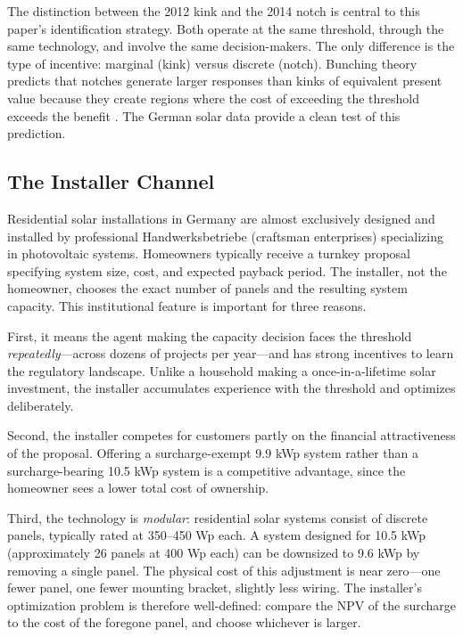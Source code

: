 \documentclass[12pt]{article}
\begin{document}
The distinction between the 2012 kink and the 2014 notch is central to this paper's identification strategy. Both operate at the same threshold, through the same technology, and involve the same decision-makers. The only difference is the type of incentive: marginal (kink) versus discrete (notch). Bunching theory predicts that notches generate larger responses than kinks of equivalent present value because they create regions where the cost of exceeding the threshold exceeds the benefit \citep{kleven2016bunching}. The German solar data provide a clean test of this prediction.

\subsection{The Installer Channel}

Residential solar installations in Germany are almost exclusively designed and installed by professional Handwerksbetriebe (craftsman enterprises) specializing in photovoltaic systems. Homeowners typically receive a turnkey proposal specifying system size, cost, and expected payback period. The installer, not the homeowner, chooses the exact number of panels and the resulting system capacity. This institutional feature is important for three reasons.

First, it means the agent making the capacity decision faces the threshold \textit{repeatedly}---across dozens of projects per year---and has strong incentives to learn the regulatory landscape. Unlike a household making a once-in-a-lifetime solar investment, the installer accumulates experience with the threshold and optimizes deliberately.

Second, the installer competes for customers partly on the financial attractiveness of the proposal. Offering a surcharge-exempt 9.9 kWp system rather than a surcharge-bearing 10.5 kWp system is a competitive advantage, since the homeowner sees a lower total cost of ownership.

Third, the technology is \textit{modular}: residential solar systems consist of discrete panels, typically rated at 350--450 Wp each. A system designed for 10.5 kWp (approximately 26 panels at 400 Wp each) can be downsized to 9.6 kWp by removing a single panel. The physical cost of this adjustment is near zero---one fewer panel, one fewer mounting bracket, slightly less wiring. The installer's optimization problem is therefore well-defined: compare the NPV of the surcharge to the cost of the foregone panel, and choose whichever is larger.
\end{document}
